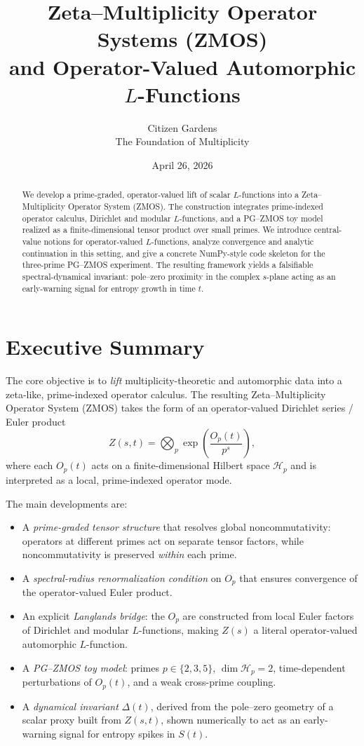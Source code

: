 \documentclass[11pt]{article}
\title{Zeta–Multiplicity Operator Systems (ZMOS)\\
and Operator-Valued Automorphic $L$-Functions}
\author{Citizen Gardens \\ The Foundation of Multiplicity}
\date{April 26, 2026}
\begin{document}
\maketitle

\begin{abstract}
We develop a prime-graded, operator-valued lift of scalar $L$-functions
into a Zeta--Multiplicity Operator System (ZMOS). The construction
integrates prime-indexed operator calculus, Dirichlet and modular
$L$-functions, and a PG--ZMOS toy model realized as a finite-dimensional
tensor product over small primes. We introduce central-value notions
for operator-valued $L$-functions, analyze convergence and analytic
continuation in this setting, and give a concrete NumPy-style code
skeleton for the three-prime PG--ZMOS experiment. The resulting
framework yields a falsifiable spectral-dynamical invariant: pole--zero
proximity in the complex $s$-plane acting as an early-warning signal
for entropy growth in time $t$.
\end{abstract}
\newpage
\tableofcontents
\newpage
\section{Executive Summary}

The core objective is to \emph{lift} multiplicity-theoretic and
automorphic data into a zeta-like, prime-indexed operator calculus.
The resulting Zeta--Multiplicity Operator System (ZMOS) takes the form
of an operator-valued Dirichlet series / Euler product
\[
  Z(s,t) = \bigotimes_{p} \exp\!\left( \frac{O_p(t)}{p^s} \right),
\]
where each $O_p(t)$ acts on a finite-dimensional Hilbert space
$\mathcal{H}_p$ and is interpreted as a local, prime-indexed operator
mode.

The main developments are:

\begin{itemize}
  \item A \emph{prime-graded tensor structure} that resolves global
  noncommutativity: operators at different primes act on separate tensor
  factors, while noncommutativity is preserved \emph{within} each prime.
  \item A \emph{spectral-radius renormalization condition} on $O_p$
  that ensures convergence of the operator-valued Euler product.
  \item An explicit \emph{Langlands bridge}: the $O_p$ are constructed
  from local Euler factors of Dirichlet and modular $L$-functions,
  making $Z(s)$ a literal operator-valued automorphic $L$-function.
  \item A \emph{PG--ZMOS toy model}: primes $p \in \{2,3,5\}$,
  $\dim \mathcal{H}_p = 2$, time-dependent perturbations of $O_p(t)$,
  and a weak cross-prime coupling.
  \item A \emph{dynamical invariant} $\Delta(t)$, derived from the
  pole--zero geometry of a scalar proxy built from $Z(s,t)$, shown
  numerically to act as an early-warning signal for entropy spikes in
  $S(t)$.
\end{itemize}
\end{document}
